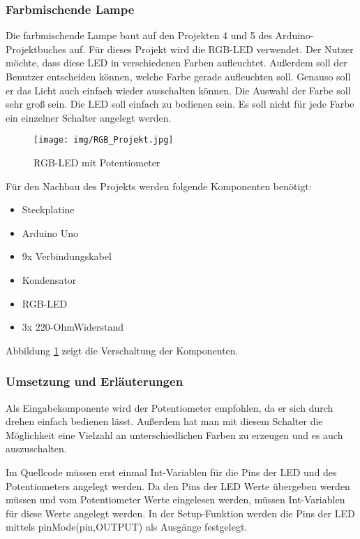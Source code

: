\subsubsection{Farbmischende Lampe}

Die farbmischende Lampe baut auf den Projekten 4 und 5 des Arduino-Projektbuches auf. Für dieses Projekt wird die RGB-LED verwendet. Der Nutzer möchte, dass diese LED in verschiedenen Farben aufleuchtet. Außerdem soll der Benutzer entscheiden können, welche Farbe gerade aufleuchten soll. Genauso soll er das Licht auch einfach wieder ausschalten können. Die Auswahl der Farbe soll sehr groß sein. Die LED soll einfach zu bedienen sein. Es soll nicht für jede Farbe ein einzelner Schalter angelegt werden.


\begin{figure}[h]
\begin{center}
\texttt{[image: img/RGB\_Projekt.jpg]}
\caption{RGB-LED mit Potentiometer}
\label{rgb_project}
\end{center}
\end{figure}

Für den Nachbau des Projekts werden folgende Komponenten benötigt:
\begin{itemize}
\item{Steckplatine}
\item{Arduino Uno}
\item{9x Verbindungskabel}
\item{Kondensator}
\item{RGB-LED}
\item{3x 220-OhmWiderstand}
\end{itemize}

Abbildung \ref{rgb_project} zeigt die Verschaltung der Komponenten.
 
\subsubsection{Umsetzung und Erläuterungen}
Als Eingabekomponente wird der Potentiometer empfohlen, da er sich durch drehen einfach bedienen lässt. Außerdem hat man mit diesem Schalter die Möglichkeit eine Vielzahl an unterschiedlichen Farben zu erzeugen und es auch auszuschalten.
 
Im Quellcode müssen erst einmal Int-Variablen für die Pins der LED und des Potentiometers angelegt werden. Da den Pins der LED Werte übergeben werden müssen und vom Potentiometer Werte eingelesen werden, müssen Int-Variablen für diese Werte angelegt werden.
In der Setup-Funktion werden die Pins der LED mittels pinMode(pin,OUTPUT) als Ausgänge festgelegt.

